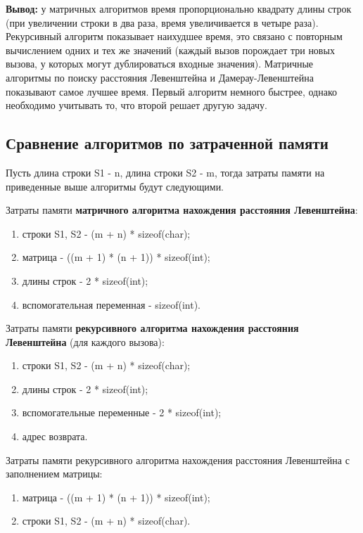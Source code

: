 \documentclass[a4paper,12pt]{article}
\begin{document}
\vspace{\baselineskip}

\textbf{Вывод:} у матричных алгоритмов время пропорционально квадрату длины строк (при увеличении строки в два раза, время увеличивается в четыре раза). Рекурсивный алгоритм показывает наихудшее время, это связано с повторным вычислением одних и тех же значений (каждый вызов порождает три новых вызова, у которых могут дублироваться входные значения). Матричные алгоритмы по поиску расстояния Левенштейна и Дамерау-Левенштейна показывают самое лучшее время. Первый алгоритм немного быстрее, однако необходимо учитывать то, что второй решает другую задачу.

\subsection{Сравнение алгоритмов по затраченной памяти}%

Пусть длина строки S1 - n, длина строки S2 - m, тогда затраты памяти на приведенные выше алгоритмы будут следующими.

\vspace{\baselineskip}

Затраты памяти \textbf{матричного алгоритма нахождения расстояния Левенштейна}:\begin{enumerate}
	\item строки S1, S2 - (m + n) * sizeof(char);
	\item матрица - ((m + 1) * (n + 1)) * sizeof(int);
	\item длины строк - 2 * sizeof(int);
	\item вспомогательная переменная - sizeof(int).
\end{enumerate}

\vspace{\baselineskip}

Затраты памяти \textbf{рекурсивного алгоритма нахождения расстояния Левенштейна} (для каждого вызова):\begin{enumerate}
	\item строки S1, S2 - (m + n) * sizeof(char);
	\item длины строк - 2 * sizeof(int);
	\item вспомогательные переменные -  2 * sizeof(int);
	\item адрес возврата.
\end{enumerate}

\vspace{\baselineskip}

Затраты памяти рекурсивного алгоритма нахождения расстояния Левенштейна с заполнением матрицы:
\begin{enumerate}
	\item матрица - ((m + 1) * (n + 1)) * sizeof(int);
	\item строки S1, S2 - (m + n) * sizeof(char).
\end{enumerate}
\end{document}
